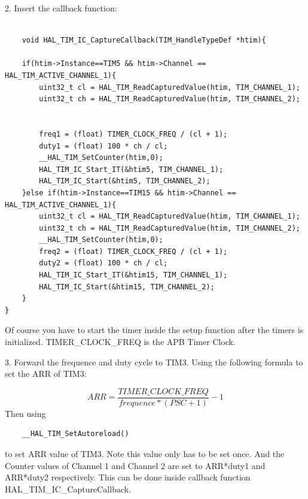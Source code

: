 \documentclass{article}
\begin{document}
2. Insert the callback function:
\begin{lstlisting}

    void HAL_TIM_IC_CaptureCallback(TIM_HandleTypeDef *htim){

	if(htim->Instance==TIM5 && htim->Channel == HAL_TIM_ACTIVE_CHANNEL_1){
		uint32_t cl = HAL_TIM_ReadCapturedValue(htim, TIM_CHANNEL_1);
		uint32_t ch = HAL_TIM_ReadCapturedValue(htim, TIM_CHANNEL_2);


		freq1 = (float) TIMER_CLOCK_FREQ / (cl + 1);
		duty1 = (float) 100 * ch / cl;
		__HAL_TIM_SetCounter(htim,0);
		HAL_TIM_IC_Start_IT(&htim5, TIM_CHANNEL_1);
		HAL_TIM_IC_Start(&htim5, TIM_CHANNEL_2);
	}else if(htim->Instance==TIM15 && htim->Channel == HAL_TIM_ACTIVE_CHANNEL_1){
		uint32_t cl = HAL_TIM_ReadCapturedValue(htim, TIM_CHANNEL_1);
		uint32_t ch = HAL_TIM_ReadCapturedValue(htim, TIM_CHANNEL_2);
		__HAL_TIM_SetCounter(htim,0);
		freq2 = (float) TIMER_CLOCK_FREQ / (cl + 1);
		duty2 = (float) 100 * ch / cl;
		HAL_TIM_IC_Start_IT(&htim15, TIM_CHANNEL_1);
		HAL_TIM_IC_Start(&htim15, TIM_CHANNEL_2);
	}
}
\end{lstlisting}


Of course you have to start the timer inside the setup function after the timers is initialized. TIMER\_CLOCK\_FREQ is the APB Timer Clock.

3. Forward the frequence and duty cycle to TIM3. Using the following formula to set the ARR of TIM3:

\begin{equation}
    ARR = \frac{TIMER\_CLOCK\_FREQ}{frequence*(PSC+1)}-1
\end{equation}
Then using
\begin{lstlisting}
    __HAL_TIM_SetAutoreload()
\end{lstlisting} to set ARR value of TIM3.
Note this value only has to be set once.
And the Counter values of Channel 1 and Channel 2 are set to ARR*duty1 and ARR*duty2 respectively. This can be done inside callback function HAL\_TIM\_IC\_CaptureCallback.
\end{document}
